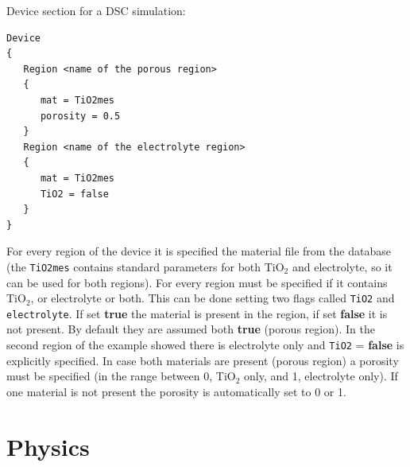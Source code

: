 Device section for a DSC simulation:
\begin{verbatim}
Device
{
   Region <name of the porous region>
   {
      mat = TiO2mes
      porosity = 0.5
   }
   Region <name of the electrolyte region>
   {
      mat = TiO2mes
      TiO2 = false
   }
}
\end{verbatim}
For every region of the device it is specified the material file
from the database (the \texttt{TiO2mes} contains standard
parameters for both TiO$_2$ and electrolyte, so it can be used for
both regions). For every region must be specified if it contains
TiO$_2$, or electrolyte or both. This can be done setting two
flags called \texttt{TiO2} and \texttt{electrolyte}. If set {\bf
true} the material is present in the region, if set {\bf false} it
is not present. By default they are assumed both {\bf true}
(porous region). In the second region of the example showed there
is electrolyte only and \texttt{TiO2} = {\bf false} is explicitly
specified. In case both materials are present (porous region) a
porosity must be specified (in the range between 0, TiO$_2$ only,
and 1, electrolyte only). If one material is not present the
porosity is automatically set to 0 or 1.


\section{Physics}


